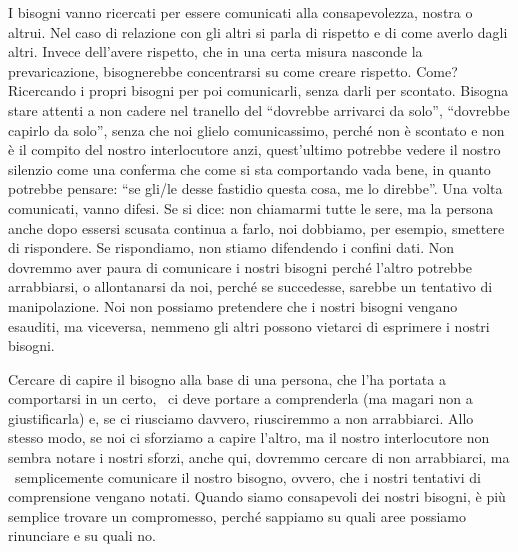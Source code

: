 \documentclass[12pt]{book} %
\begin{document}
I bisogni vanno ricercati per essere comunicati alla consapevolezza, nostra o altrui. Nel caso di relazione con gli
altri si parla di rispetto e di come averlo dagli altri. Invece dell'avere rispetto, che in una
certa misura nasconde la prevaricazione, bisognerebbe concentrarsi su come creare rispetto. Come? Ricercando i propri
bisogni per poi comunicarli, senza darli per scontato. Bisogna stare attenti a non cadere nel tranello del “dovrebbe
arrivarci da solo”, “dovrebbe capirlo da solo”, senza che noi glielo comunicassimo, perché non è scontato e non è il
compito del nostro interlocutore anzi, quest'ultimo potrebbe vedere il nostro silenzio come una
conferma che come si sta comportando vada bene, in quanto potrebbe pensare: “se gli/le desse fastidio questa cosa, me
lo direbbe”. Una volta comunicati, vanno difesi. Se si dice: non chiamarmi tutte le sere, ma la persona anche dopo
essersi scusata continua a farlo, noi dobbiamo, per esempio, smettere di rispondere. Se rispondiamo, non stiamo
difendendo i confini dati. Non dovremmo aver paura di comunicare i nostri bisogni perché l'altro
potrebbe arrabbiarsi, o allontanarsi da noi, perché se succedesse, sarebbe un tentativo di manipolazione. Noi non
possiamo pretendere che i nostri bisogni vengano esauditi, ma viceversa, nemmeno gli altri possono vietarci di
esprimere i nostri bisogni. 

Cercare di capire il bisogno alla base di una persona, che l'ha portata a comportarsi in un certo,
\ ci deve portare a comprenderla (ma magari non a giustificarla) e, se ci riusciamo davvero, riusciremmo a non
arrabbiarci. Allo stesso modo, se noi ci sforziamo a capire l'altro, ma il nostro interlocutore non sembra notare i
nostri sforzi, anche qui, dovremmo cercare di non arrabbiarci, ma \ semplicemente comunicare il nostro bisogno, ovvero,
che i nostri tentativi di comprensione vengano notati. Quando siamo consapevoli dei nostri bisogni, è più semplice
trovare un compromesso, perché sappiamo su quali aree possiamo rinunciare e su quali no.
\end{document}
